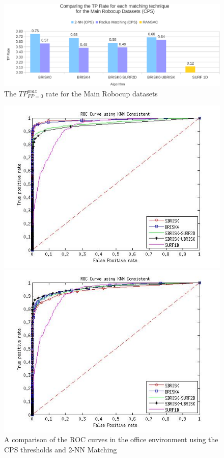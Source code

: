 \begin{figure}
  \centering
    \includegraphics[width=1.0\textwidth]{../Drawings/Graphs/tp_rate_mrb_cps.pdf}
    \caption{The $TP_{FP=0}^{max}$ rate for the Main Robocup datasets} 
    \label{app:tp_rate_mrd}
\end{figure}


\begin{figure}[ht!]
\begin{minipage}[b]{0.5\linewidth}
\includegraphics[scale=0.4]{../Drawings/dataset2_ROC_General_KNN_Consistent.jpg}
\caption{A comparison of the ROC curves in the office environment using the CPS thresholds and 2-NN Matching}
\label{fig:compareKnnConsistentOffice}
\end{minipage}
\hspace{0.5cm}
\begin{minipage}[b]{0.5\linewidth}
\includegraphics[scale=0.4]{../Drawings/dataset2_ROC_General_Hamming_Consistent.jpg}

\end{minipage}
\end{figure}
